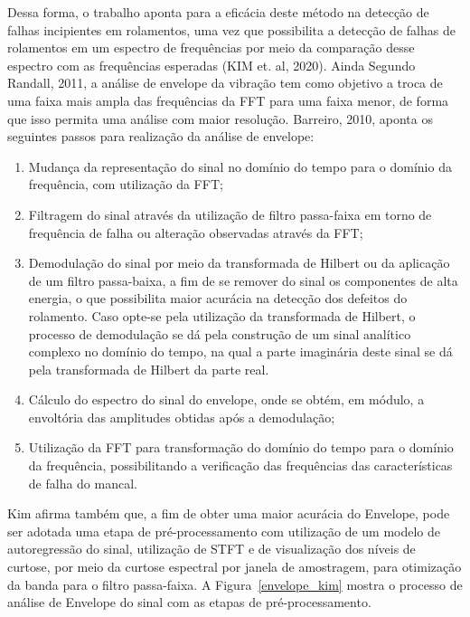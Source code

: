 \documentclass[
	12pt,				
	oneside,			
	a4paper,			
	english,			
	brazil,			
	]{abntex2ppgsi}
\begin{document}
Dessa forma, o trabalho aponta para a eficácia deste método na detecção de falhas incipientes em rolamentos, uma vez que possibilita a detecção de falhas de rolamentos em um espectro de frequências por meio da comparação desse espectro com as frequências esperadas (KIM et. al, 2020). Ainda Segundo Randall, 2011, a análise de envelope da vibração tem como objetivo a troca de uma faixa mais ampla das frequências da FFT para uma faixa menor, de forma que isso permita uma análise com maior resolução. Barreiro, 2010, aponta os seguintes passos para realização da análise de envelope:

\begin{enumerate}
	\item Mudança da representação do sinal no domínio do tempo para o domínio da frequência, com utilização da FFT;
	\item Filtragem do sinal através da utilização de filtro passa-faixa em torno de frequência de falha ou alteração observadas através da FFT;
	\item Demodulação do sinal por meio da transformada de Hilbert ou da aplicação de um filtro passa-baixa, a fim de se remover do sinal os componentes de alta energia, o que possibilita maior acurácia na detecção dos defeitos do rolamento. Caso opte-se pela utilização da transformada de Hilbert, o processo de demodulação se dá pela construção de um sinal analítico complexo no domínio do tempo, na qual a parte imaginária deste sinal se dá pela transformada de Hilbert da parte real.  
	\item Cálculo do espectro do sinal do envelope, onde se obtém, em módulo, a envoltória das amplitudes obtidas após a demodulação;
	\item Utilização da FFT para transformação do domínio do tempo para o domínio da frequência, possibilitando a verificação das frequências das características de falha do mancal.
\end{enumerate}

Kim afirma também que, a fim de obter uma maior acurácia do Envelope, pode ser adotada uma etapa de pré-processamento com utilização de um modelo de autoregressão do sinal, utilização de STFT e de visualização dos níveis de curtose, por meio da curtose espectral por janela de amostragem, para otimização da banda para o filtro passa-faixa. A Figura~\ref{envelope_kim} mostra o processo de análise de Envelope do sinal com as etapas de pré-processamento. 
\end{document}
